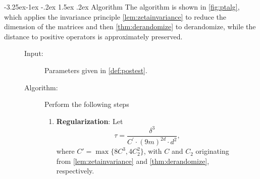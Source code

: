 \documentclass[10pt,a4paper]{article}
\makeatletter
\renewcommand{\subsection}{\@startsection{subsection}{2}{\z@}%
             {-3.25ex\@plus -1ex \@minus -.2ex}%
             {1.5ex \@plus .2ex}%
             {\normalfont\large\scshape\bfseries}}
\theoremstyle{plain}
\theoremstyle{definition}
\newenvironment{Algorithm}{\begin{framed}}{\end{framed}}
\newcommand{\dldd} {\ensuremath{{d}}}
\newcommand{\1}{\mathbb{1}} %
\makeatother
\begin{document}
\subsection{Algorithm}
The algorithm is shown in \cref{fig:ptalg}, which applies the invariance principle \cref{lem:zetainvariance} to reduce the dimension of the matrices and then \cref{thm:derandomize} to derandomize, while the distance to positive operators is approximately preserved.
\begin{figure}
\begin{Algorithm}
\begin{description}
    \item[Input:] Parameters given in \cref{def:postest}.
    \item[Algorithm:] Perform the following steps
    
        \begin{enumerate}
          \item \textbf{Regularization}: 
            Let
            \begin{equation}\label{eq:chooseoftau}
                \tau = \frac{\delta^3}{C^\prime\cdot(9m)^{2\dldd}\cdot\dldd^2},
            \end{equation}
            where $C'=\max\{8C^3,4C_2^2\}$, with $C$ and $C_2$ originating from \cref{lem:zetainvariance} and \cref{thm:derandomize}, respectively. 
            

\end{enumerate}
\end{description}
\end{Algorithm}
\end{figure}
\end{document}
